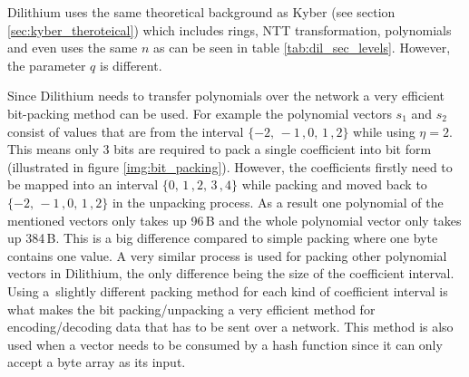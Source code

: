 Dilithium uses the same theoretical background as Kyber (see section \ref{sec:kyber_theroteical}) which includes rings, NTT transformation, polynomials and even uses the same $n$ as can be seen in table \ref{tab:dil_sec_levels}. However, the parameter $q$ is different.


Since Dilithium needs to transfer polynomials over the network a very efficient bit-packing method can be used. For example the polynomial vectors $s_1$ and $s_2$ consist of values that are from the interval $\{-2,\,-1\,,0,\,1\,,2\}$ while using $\eta=2$. This means only 3 bits are required to pack a single coefficient into bit form (illustrated in figure \ref{img:bit_packing}). However, the coefficients firstly need to be mapped into an interval $\{0,\,1\,,2,\,3\,,4\}$ while packing and moved back to $\{-2,\,-1\,,0,\,1\,,2\}$ in the unpacking process. As a result one polynomial of the mentioned vectors only takes up 96\,B and the whole polynomial vector only takes up 384\,B. This is a big difference compared to simple packing where one byte contains one value. A very similar process is used for packing other polynomial vectors in Dilithium, the only difference being the size of the coefficient interval. Using a~slightly different packing method for each kind of coefficient interval is what makes the bit packing/unpacking a very efficient method for encoding/decoding data that has to be sent over a network. This method is also used when a vector needs to be consumed by a hash function since it can only accept a byte array as its input.
